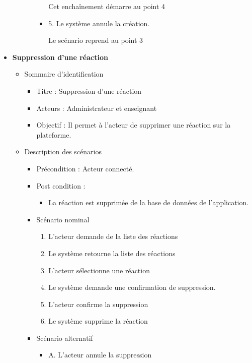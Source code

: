 \begin{itemize}
\begin{itemize}
\begin{itemize}
\begin{itemize}
				                        Cet enchaînement démarre au point 4

				                  \item 5. Le système annule la création.

				                        Le scénario reprend au point 3
			                  \end{itemize}
		            \end{itemize}
	      \end{itemize}

	\item \textbf{Suppression d’une réaction }
	      \begin{itemize}
		      \item Sommaire d’identification
		            \begin{itemize}
			            \item Titre : Suppression d’une réaction
			            \item Acteurs : Administrateur et enseignant
			            \item Objectif : Il permet à l’acteur de supprimer une réaction sur la plateforme.
		            \end{itemize}
		      \item Description des scénarios
		            \begin{itemize}
			            \item Précondition : Acteur connecté.
			            \item Post condition :
			                  \begin{itemize}
				                  \item La réaction est supprimée de la base de données de l’application.
			                  \end{itemize}
			            \item Scénario nominal
			                  \begin{enumerate}
				                  \item L’acteur demande de la liste des réactions
				                  \item Le système retourne la liste des réactions
				                  \item L’acteur sélectionne une réaction
				                  \item Le système demande une confirmation de suppression.
				                  \item L’acteur confirme la suppression
				                  \item Le système supprime la réaction
			                  \end{enumerate}
			            \item Scénario alternatif
			                  \begin{itemize}
				                  \item A. L’acteur annule la suppression


\end{itemize}
\end{itemize}
\end{itemize}
\end{itemize}
